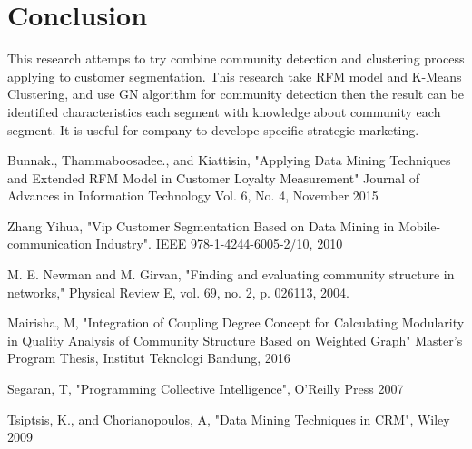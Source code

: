 \documentclass[conference]{IEEEtran}
\begin{document}
\section{Conclusion}
This research attemps to try combine community detection and clustering process applying to customer segmentation. This research take RFM model and K-Means Clustering, and use GN algorithm for community detection then the result can be identified characteristics each segment with knowledge about community each segment. It is useful for company to develope specific strategic marketing.






\begin{thebibliography}{1}

Bunnak., Thammaboosadee., and Kiattisin, "Applying Data Mining Techniques
and Extended RFM Model in Customer Loyalty Measurement" Journal of
Advances in Information Technology Vol. 6, No. 4, November 2015

Zhang Yihua, "Vip Customer Segmentation Based on Data Mining in
Mobile-communication Industry". IEEE 978-1-4244-6005-2/10, 2010

M. E. Newman and M. Girvan, "Finding and evaluating
community structure in networks," Physical Review E,
vol. 69, no. 2, p. 026113, 2004.

Mairisha, M, "Integration of Coupling Degree Concept for Calculating Modularity in Quality Analysis of
Community Structure Based on Weighted Graph" Master’s Program Thesis, Institut Teknologi Bandung, 2016

Segaran, T, "Programming Collective Intelligence", O'Reilly Press 2007

Tsiptsis, K., and Chorianopoulos, A, "Data Mining Techniques in CRM", Wiley 2009
\end{thebibliography}




\end{document}
